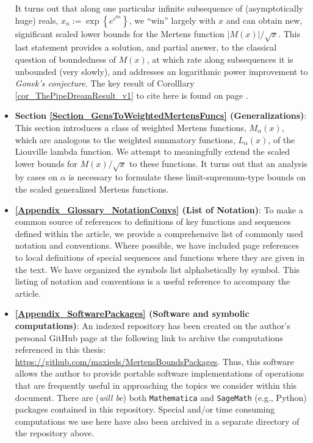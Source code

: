 \documentclass[11pt,reqno,a4letter]{article}
\numberwithin{figure}{section}
\numberwithin{table}{section}
\theoremstyle{plain}
\numberwithin{theorem}{section}
\theoremstyle{definition}
\begin{document}
\begin{itemize}
           It turns out that along one particular infinite subsequence of (asymptotically huge) reals, 
           $x_n := \exp\left\{e^{e^{6n}}\right\}$, we ``win'' largely with $x$ 
           and can obtain new, significant scaled lower bounds 
           for the Mertens function $|M(x)| / \sqrt{x}$. This last statement provides a solution, and 
           partial answer, to the classical 
           question of boundedness of $M(x)$, at which rate along subsequences it is unbounded (very slowly), 
           and addresses an logarithmic power improvement to \emph{Gonek's conjecture}. 
           The key result of Corolllary \ref{cor_ThePipeDreamResult_v1} to cite here is found on page 
           \pageref{cor_ThePipeDreamResult_v1}. 
     \item \textbf{Section \ref{Section_GensToWeightedMertensFuncs} (Generalizations)}: 
           This section introduces a class of weighted Mertens functions, $M_{\alpha}(x)$, which are analogous 
           to the weighted summatory functions, $L_{\alpha}(x)$, of the Liouville lambda function. 
           We attempt to meaningfully extend the scaled lower bounds for $M(x) / \sqrt{x}$ to these 
           functions. It turns out that an analysis by cases on $\alpha$ is necessary to formulate these 
           limit-supremum-type bounds on the scaled generalized Mertens functions. 
     \item \textbf{\ref{Appendix_Glossary_NotationConvs} (List of Notation)}: 
           To make a common source of references to definitions of key functions and sequences defined within the article, 
           we provide a comprehensive list of commonly used notation and conventions. 
           Where possible, we have included page references to local definitions of special 
           sequences and functions where they are given in the text. 
           We have organized the symbols list alphabetically by symbol. 
           This listing of notation and conventions is a useful reference to accompany the article. 
     \item \textbf{\ref{Appendix_SoftwarePackages} (Software and symbolic computations)}: 
           An indexed repository has been created on the 
           author's personal GitHub page at the following link to archive the 
           computations referenced in this thesis: 
           \href{https://github.com/maxieds/MertensBoundsPackages}{\url{https://github.com/maxieds/MertensBoundsPackages}}. 
           Thus, this software allows the author to provide portable software implementations 
           of operations that are frequently useful in approaching the topics we consider within this 
           document. There are (\emph{will be}) both \texttt{Mathematica} and \texttt{SageMath} (e.g., Python) packages 
           contained in this repository. Special and/or time consuming computations we use here have also 
           been archived in a separate directory of the repository above. 
\end{itemize} 
\end{document}
